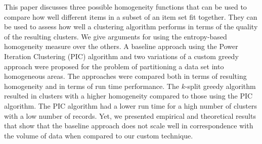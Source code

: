 This paper discusses three possible homogeneity functions that can be used to compare how well different items in a subset of an item set fit together. They can be used to assess how well a clustering algorithm performs in terms of the quality of the resulting clusters. We give arguments for using the entropy-based homogeneity measure over the others. A baseline approach using the Power Iteration Clustering (PIC) algorithm and two variations of a custom greedy approach were proposed for the problem of partitioning a data set into homogeneous areas. The approaches were compared both in terms of resulting homogeneity and in terms of run time performance. The $k$-split greedy algorithm resulted in clusters with a higher homogeneity compared to those using the PIC algorithm. The PIC algorithm had a lower run time for a high number of clusters with a low number of records. Yet, we presented empirical and theoretical results that show that the baseline approach does not scale well in correspondence with the volume of data when compared to our custom technique.